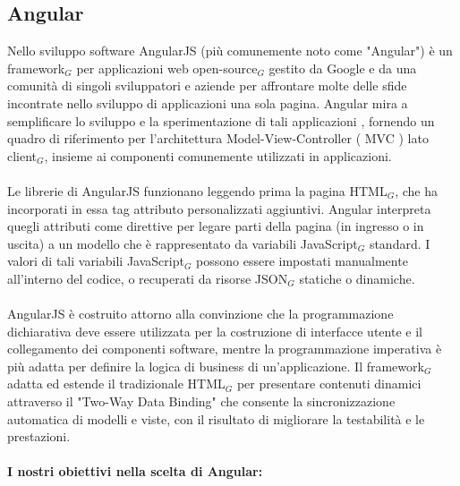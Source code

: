 \subsection{Angular}

Nello sviluppo software AngularJS (più comunemente noto come "Angular") è un framework$_G$  per applicazioni web open-source$_G$ gestito da Google e da una comunità di singoli sviluppatori e aziende per affrontare molte delle sfide incontrate nello sviluppo di applicazioni una sola pagina. Angular mira a 
semplificare lo sviluppo e la sperimentazione di tali applicazioni , fornendo un quadro di riferimento per l'architettura Model-View-Controller ( MVC ) lato client$_G$, insieme ai componenti comunemente utilizzati in applicazioni.\\
\\
Le librerie di AngularJS funzionano leggendo prima la pagina HTML$_G$, che ha incorporati in essa tag attributo personalizzati aggiuntivi. Angular interpreta quegli attributi come direttive per legare parti della pagina (in ingresso o in uscita) a un modello che è rappresentato da variabili JavaScript$_G$ standard. I valori di tali variabili JavaScript$_G$ possono essere impostati manualmente all'interno del codice, o recuperati da risorse JSON$_G$ statiche o dinamiche.\\
\\
AngularJS è costruito attorno alla convinzione che la programmazione dichiarativa deve essere utilizzata per la costruzione di interfacce utente e il collegamento dei componenti software, mentre la programmazione imperativa è più adatta per definire la logica di business di un'applicazione. Il  framework$_G$ adatta ed estende il tradizionale HTML$_G$ per presentare contenuti dinamici attraverso il "Two-Way Data Binding" che consente la sincronizzazione automatica di modelli e viste, con il risultato di migliorare la testabilità e le prestazioni.\\
\\
\textbf{I nostri obiettivi nella scelta di Angular:
}
